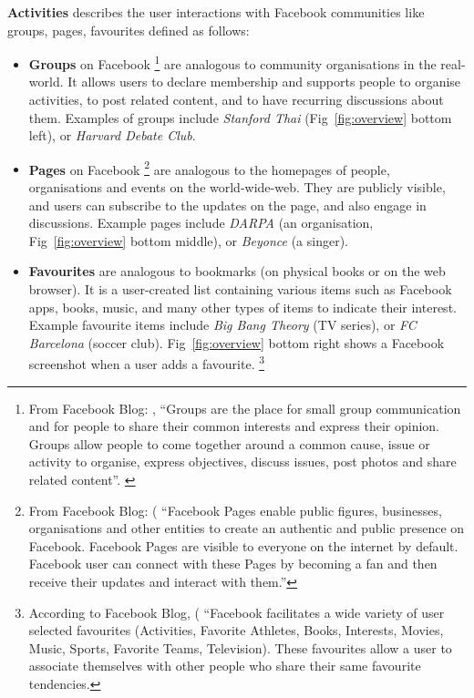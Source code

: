 {\bf Activities} describes the user interactions with Facebook communities like groups, pages, favourites defined as follows:
\begin{itemize}
  \item \textbf{Groups} on Facebook 
\footnote{From Facebook Blog: 
, ``Groups are the place for small group communication and for people to share their common interests and express their opinion. Groups allow people to come together around a common cause, issue or activity to organise, express objectives, discuss issues, post photos and share related content''. 
\label{fn:fbblog}}
are analogous to community organisations in the real-world. It allows
  users to declare membership and supports people to organise
  activities, to post related content, and to have recurring
  discussions about them.  Examples of groups include {\em Stanford
  Thai} (Fig~\ref{fig:overview} bottom left), or {\em Harvard Debate
  Club}.  \item \textbf{Pages} on Facebook \footnote{From Facebook
  Blog:
  (
  ``Facebook Pages enable public figures, businesses, organisations
  and other entities to create an authentic and public presence on
  Facebook. Facebook Pages are visible to everyone on the internet by
  default. Facebook user can connect with these Pages by becoming a
  fan and then receive their updates and interact with them.'' }
  are analogous to the homepages of people, organisations and events
  on the world-wide-web. They are publicly visible, and users can
  subscribe to the updates on the page, and also engage in
  discussions. Example pages include {\em DARPA} (an organisation,
  Fig~\ref{fig:overview} bottom middle), or {\em Beyonce} (a singer).

  \item \textbf{Favourites} are analogous to bookmarks (on physical
  books or on the web browser). It is a user-created list containing
  various items such as Facebook apps, books, music, and many other
  types of items to indicate their interest. Example favourite items
  include {\em Big Bang Theory} (TV series), or {\em FC Barcelona}
  (soccer club). Fig~\ref{fig:overview} bottom right shows a Facebook
  screenshot when a user adds a favourite.  \footnote{According to
  Facebook Blog, (
  ``Facebook facilitates a wide variety of user selected favourites
  (Activities, Favorite Athletes, Books, Interests, Movies, Music,
  Sports, Favorite Teams, Television). These favourites allow a user
  to associate themselves with other people who share their same
  favourite tendencies.}
\end{itemize} 

